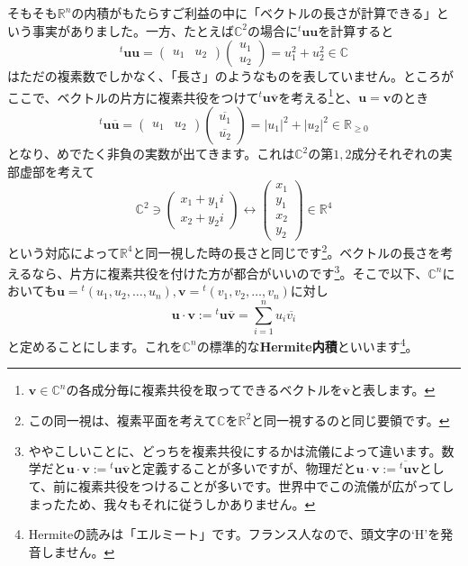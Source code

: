 そもそも$\mathbb{R}^n$の内積がもたらすご利益の中に「ベクトルの長さが計算できる」という事実がありました。一方、たとえば$\mathbb{C}^2$の場合に${}^t\bm{u} \bm{u}$を計算すると
\[
{}^t\bm{u} \bm{u} = 
\begin{pmatrix}
u_1 & u_2
\end{pmatrix}
\begin{pmatrix}
u_1 \\
u_2
\end{pmatrix}
= u_1^2 + u_2^2 \in \mathbb{C}
\]
はただの複素数でしかなく、「長さ」のようなものを表していません。ところがここで、ベクトルの片方に複素共役をつけて${}^t\bm{u}\overline{\bm{v}}$を考える\footnote{$\bm{v}\in\mathbb{C}^n$の各成分毎に複素共役を取ってできるベクトルを$\overline{\bm{v}}$と表します。}と、$\bm{u} = \bm{v}$のとき
\[
{}^t\bm{u}\overline{\bm{u}}
=
\begin{pmatrix}
u_1 & u_2
\end{pmatrix}
\begin{pmatrix}
\overline{u_1} \\
\overline{u_2}
\end{pmatrix}
= |u_1|^2 + |u_2|^2 \in \mathbb{R}_{\geq 0}
\]
となり、めでたく非負の実数が出てきます。これは$\mathbb{C}^2$の第$1, 2$成分それぞれの実部虚部を考えて
\[
\mathbb{C}^2 \ni
\begin{pmatrix}
x_1 + y_1 i \\
x_2 + y_2 i
\end{pmatrix}
\longleftrightarrow
\begin{pmatrix}
x_1 \\
y_1 \\
x_2 \\
y_2
\end{pmatrix}
\in \mathbb{R}^4
\]
という対応によって$\mathbb{R}^4$と同一視した時の長さと同じです\footnote{この同一視は、複素平面を考えて$\mathbb{C}$を$\mathbb{R}^2$と同一視するのと同じ要領です。}。ベクトルの長さを考えるなら、片方に複素共役を付けた方が都合がいいのです\footnote{ややこしいことに、どっちを複素共役にするかは流儀によって違います。数学だと$\bm{u} \cdot \bm{v} := {}^t\bm{u} \overline{\bm{v}}$と定義することが多いですが、物理だと$\bm{u} \cdot \bm{v} := \overline{{}^t\bm{u}}\bm{v}$として、前に複素共役をつけることが多いです。世界中でこの流儀が広がってしまったため、我々もそれに従うしかありません。}。そこで以下、$\mathbb{C}^n$においても$\bm{u} = {}^t(u_1, u_2, \ldots, u_n), \bm{v} = {}^t(v_1, v_2 ,\ldots, v_n)$に対し
\[
\bm{u} \cdot \bm{v} := {}^t\bm{u} \overline{\bm{v}} = \sum_{i = 1}^n u_i \overline{v_i}
\]
と定めることにします。これを$\mathbb{C}^n$の標準的な\textbf{Hermite内積}といいます\footnote{Hermiteの読みは「エルミート」です。フランス人なので、頭文字の`H'を発音しません。}。

